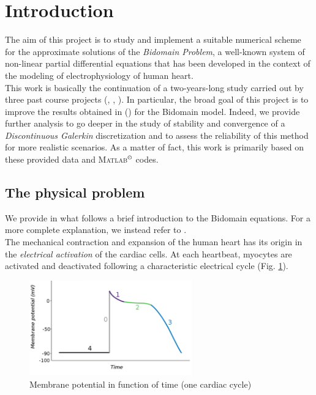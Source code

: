 \documentclass[a4paper,11pt]{article}
\begin{document}
    \section{Introduction}
    The aim of this project is to study and implement a suitable numerical scheme for the approximate solutions of the \emph{Bidomain Problem}, a well-known system of non-linear partial differential equations that has been developed in the context of the modeling of electrophysiology of human heart. \\
    This work is basically the continuation of a two-years-long study carried out by three past course projects (\cite{bagnara}, \cite{andreotti}, \cite{marta}). In particular, the broad goal of this project is to improve the results obtained in \parencite{marta} (\citeauthor{marta}) for the Bidomain model. Indeed, we provide further analysis to go deeper in the study of stability and convergence of a \emph{Discontinuous Galerkin} discretization and to assess the reliability of this method for more realistic scenarios. As a matter of fact, this work is primarily based on these provided data and \textsc{Matlab}$^ \copyright$ codes.
    
    \subsection{The physical problem}
    We provide in what follows a brief introduction to the Bidomain equations. For a more complete explanation, we instead refer to \cite{acta}.\\
    The mechanical contraction and expansion of the human heart has its origin in the \emph{electrical activation} of the cardiac cells. At each heartbeat, myocytes are activated and deactivated following a characteristic electrical cycle (Fig. \ref{potential_cycle}). 
    
    
    \begin{figure}[h]
    \begin{center}
    \includegraphics[width = 7cm]{./potential_cycle.png}
    \caption{Membrane potential in function of time (one cardiac cycle)}
    \label{potential_cycle}
    \end{center}
    \end{figure}
    
\end{document}
